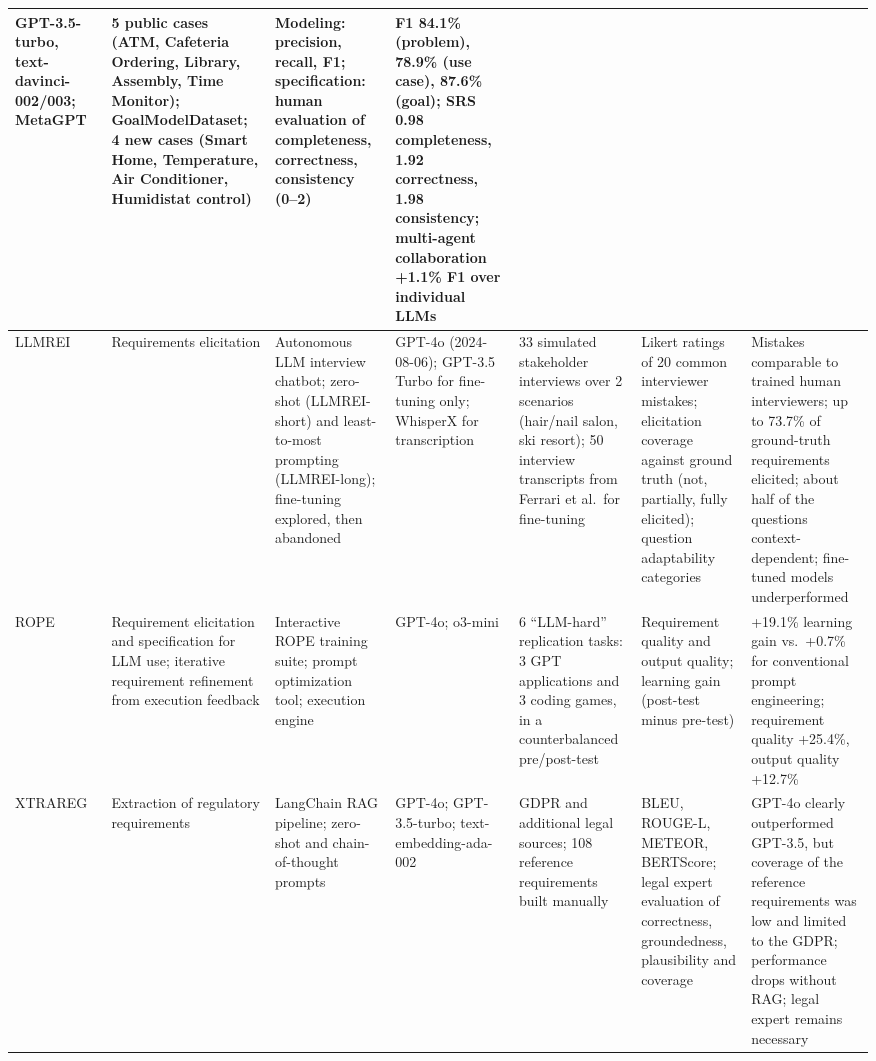 \begin{appendices}
\begin{landscape}
\begin{longtable}{|p{2.0cm}|p{2.6cm}|p{2.6cm}|p{2.2cm}|p{4.0cm}|p{4.0cm}|p{4.4cm}|}
    GPT-3.5-turbo, text-davinci-002/003; MetaGPT &
    5 public cases (ATM, Cafeteria Ordering, Library, Assembly, Time Monitor); GoalModelDataset; 4 new cases (Smart Home, Temperature, Air Conditioner, Humidistat control) &
    Modeling: precision, recall, F1; specification: human evaluation of completeness, correctness, consistency (0--2) &
    F1 84.1\% (problem), 78.9\% (use case), 87.6\% (goal); SRS 0.98 completeness, 1.92 correctness, 1.98 consistency; multi-agent collaboration +1.1\% F1 over individual LLMs \\
    \hline
    LLMREI~\cite{korn2025llmrei} &
    Requirements elicitation &
    Autonomous LLM interview chatbot; zero-shot (LLMREI-short) and least-to-most prompting (LLMREI-long); fine-tuning explored, then abandoned &
    GPT-4o (2024-08-06); GPT-3.5 Turbo for fine-tuning only; WhisperX for transcription &
    33 simulated stakeholder interviews over 2 scenarios (hair/nail salon, ski resort); 50 interview transcripts from Ferrari et al.\ for fine-tuning &
    Likert ratings of 20 common interviewer mistakes; elicitation coverage against ground truth (not, partially, fully elicited); question adaptability categories &
    Mistakes comparable to trained human interviewers; up to 73.7\% of ground-truth requirements elicited; about half of the questions context-dependent; fine-tuned models underperformed \\
    \hline
    ROPE~\cite{ma2025rope} &
    Requirement elicitation and specification for LLM use; iterative requirement refinement from execution feedback &
    Interactive ROPE training suite; prompt optimization tool; execution engine &
    GPT-4o; o3-mini &
    6 ``LLM-hard'' replication tasks: 3 GPT applications and 3 coding games, in a counterbalanced pre/post-test &
    Requirement quality and output quality; learning gain (post-test minus pre-test) &
    +19.1\% learning gain vs.\ +0.7\% for conventional prompt engineering; requirement quality +25.4\%, output quality +12.7\% \\
    \hline
    XTRAREG~\cite{abualhaija2025llm} &
    Extraction of regulatory requirements &
    LangChain RAG pipeline; zero-shot and chain-of-thought prompts &
    GPT-4o; GPT-3.5-turbo; text-embedding-ada-002 &
    GDPR and additional legal sources; 108 reference requirements built manually &
    BLEU, ROUGE-L, METEOR, BERTScore; legal expert evaluation of correctness, groundedness, plausibility and coverage &
    GPT-4o clearly outperformed GPT-3.5, but coverage of the reference requirements was low and limited to the GDPR; performance drops without RAG; legal expert remains necessary \\

\end{longtable}
\end{landscape}
\end{appendices}
